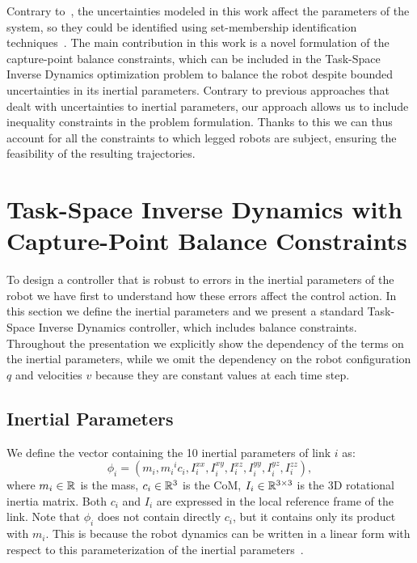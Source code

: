 Contrary to~\cite{Mordatch2015,Nguyen}, the uncertainties modeled in this work affect the parameters of the system, so they could be identified using set-membership identification techniques~\cite{Ramdani2005}.
The main contribution in this work is a novel formulation of the capture-point balance constraints, which can be included in the Task-Space Inverse Dynamics optimization problem to balance the robot despite bounded uncertainties in its inertial parameters.
Contrary to previous approaches that dealt with uncertainties to inertial parameters, our approach allows us to include inequality constraints in the problem formulation.
Thanks to this we can thus account for all the constraints to which legged robots are subject, ensuring the feasibility of the resulting trajectories.


\section{Task-Space Inverse Dynamics with Capture-Point Balance Constraints}
\label{sec:tsid}
To design a controller that is robust to errors in the inertial parameters of the robot we have first to understand how these errors affect the control action.
In this section we define the inertial parameters and we present a standard Task-Space Inverse Dynamics controller, which includes balance constraints. 
Throughout the presentation we explicitly show the dependency of the terms on the inertial parameters, while we omit the dependency on the robot configuration $q$ and velocities $v$ because they are constant values at each time step.

\subsection{Inertial Parameters}
We define the vector containing the 10 inertial parameters of link $i$ as:
\begin{equation*}
\phi_i = (m_i, m_i {}^i c_i, I_i^{xx}, I_i^{xy}, I_i^{xz}, I_i^{yy}, I_i^{yz}, I_i^{zz} ),
\end{equation*}
where $m_i \in \mathbb{R}^{}$ is the mass, $c_i \in \mathbb{R}^{3}$ is the CoM, $I_i \in \mathbb{R}^{3\times 3}$ is the 3D rotational inertia matrix.
Both $c_i$ and $I_i$ are expressed in the local reference frame of the link.
Note that $\phi_i$ does not contain directly $c_i$, but it contains only its product with $m_i$.
This is because the robot dynamics can be written in a linear form with respect to this parameterization of the inertial parameters~\cite{Traversaro2015}.

